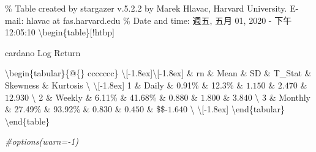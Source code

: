 \documentclass[
]{article}
\newenvironment{Shaded}{\begin{snugshade}}{\end{snugshade}}
\newcommand{\CommentTok}[1]{\textcolor[rgb]{0.56,0.35,0.01}{\textit{#1}}}
\begin{document}
\% Table created by stargazer v.5.2.2 by Marek Hlavac, Harvard
University. E-mail: hlavac at fas.harvard.edu \% Date and time: 週五,
五月 01, 2020 - 下午 12:05:10 \textbackslash begin\{table\}{[}!htbp{]}
\centering 

\caption{cardano Log Return} 
  \label{}

\textbackslash begin\{tabular\}\{@\{\extracolsep{5pt}\} ccccccc\}
\textbackslash{[}-1.8ex{]}\hline  \hline \textbackslash{[}-1.8ex{]} \&
rn \& Mean \& SD \& T\_Stat \& Skewness \& Kurtosis \textbackslash{}
\hline \textbackslash{[}-1.8ex{]} 1 \& Daily \& 0.91\% \& 12.3\% \&
\(1.150\) \& \(2.470\) \& \(12.930\) \textbackslash{} 2 \& Weekly \&
6.11\% \& 41.68\% \& \(0.880\) \& \(1.800\) \& \(3.840\)
\textbackslash{} 3 \& Monthly \& 27.49\% \& 93.92\% \& \(0.830\) \&
\(0.450\) \& \$\$-\(1.640\) \textbackslash{}
\hline \textbackslash{[}-1.8ex{]} \textbackslash end\{tabular\}
\textbackslash end\{table\}

\begin{Shaded}
\begin{Highlighting}[]
\CommentTok{#options(warn=-1)}
\end{Highlighting}
\end{Shaded}
\end{document}
